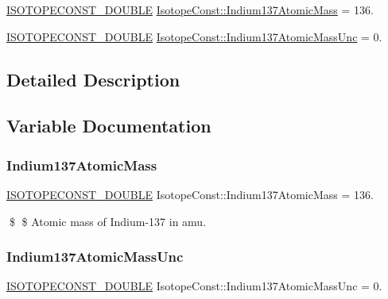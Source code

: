 \begin{DoxyCompactItemize}
\item 
\mbox{\hyperlink{group___isotope_const-_macros_ga8f45a7272ce02c0b4c65c44636ed719a}{I\+S\+O\+T\+O\+P\+E\+C\+O\+N\+S\+T\+\_\+\+D\+O\+U\+B\+LE}} \mbox{\hyperlink{group___isotope_const-_indium-_in137_ga37e54180765785560d9b806afc5756e4}{Isotope\+Const\+::\+Indium137\+Atomic\+Mass}} = 136.
\item 
\mbox{\hyperlink{group___isotope_const-_macros_ga8f45a7272ce02c0b4c65c44636ed719a}{I\+S\+O\+T\+O\+P\+E\+C\+O\+N\+S\+T\+\_\+\+D\+O\+U\+B\+LE}} \mbox{\hyperlink{group___isotope_const-_indium-_in137_ga500c1037ad86005683956eb8e3692bc8}{Isotope\+Const\+::\+Indium137\+Atomic\+Mass\+Unc}} = 0.
\end{DoxyCompactItemize}


\subsection{Detailed Description}


\subsection{Variable Documentation}
\mbox{\label{group___isotope_const-_indium-_in137_ga37e54180765785560d9b806afc5756e4}} 
\subsubsection{\texorpdfstring{Indium137\+Atomic\+Mass}{Indium137AtomicMass}}
{\footnotesize\ttfamily \mbox{\hyperlink{group___isotope_const-_macros_ga8f45a7272ce02c0b4c65c44636ed719a}{I\+S\+O\+T\+O\+P\+E\+C\+O\+N\+S\+T\+\_\+\+D\+O\+U\+B\+LE}} Isotope\+Const\+::\+Indium137\+Atomic\+Mass = 136.}

\$ \$ Atomic mass of Indium-\/137 in amu. \mbox{\label{group___isotope_const-_indium-_in137_ga500c1037ad86005683956eb8e3692bc8}} 
\subsubsection{\texorpdfstring{Indium137\+Atomic\+Mass\+Unc}{Indium137AtomicMassUnc}}
{\footnotesize\ttfamily \mbox{\hyperlink{group___isotope_const-_macros_ga8f45a7272ce02c0b4c65c44636ed719a}{I\+S\+O\+T\+O\+P\+E\+C\+O\+N\+S\+T\+\_\+\+D\+O\+U\+B\+LE}} Isotope\+Const\+::\+Indium137\+Atomic\+Mass\+Unc = 0.}

